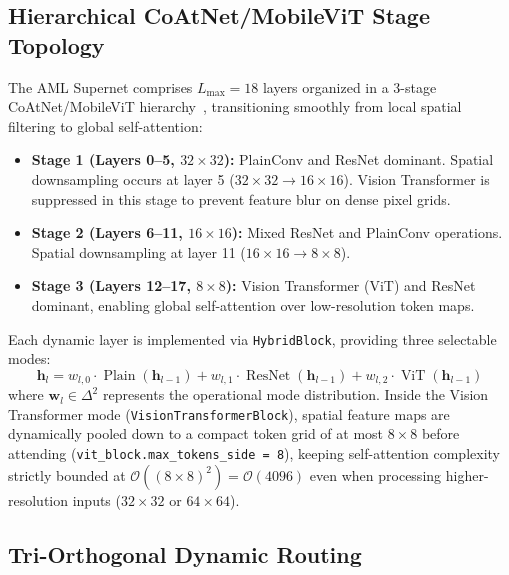 \documentclass[11pt, a4paper]{article}
\begin{document}
\subsection{Hierarchical CoAtNet/MobileViT Stage Topology}

The AML Supernet comprises $L_{\max} = 18$ layers organized in a 3-stage CoAtNet/MobileViT hierarchy~\cite{dai2021coatnet, mehta2021mobilevit}, transitioning smoothly from local spatial filtering to global self-attention:
\begin{itemize}
    \item \textbf{Stage 1 (Layers 0--5, $32 \times 32$):} PlainConv and ResNet dominant. Spatial downsampling occurs at layer 5 ($32 \times 32 \to 16 \times 16$). Vision Transformer is suppressed in this stage to prevent feature blur on dense pixel grids.
    \item \textbf{Stage 2 (Layers 6--11, $16 \times 16$):} Mixed ResNet and PlainConv operations. Spatial downsampling at layer 11 ($16 \times 16 \to 8 \times 8$).
    \item \textbf{Stage 3 (Layers 12--17, $8 \times 8$):} Vision Transformer (ViT) and ResNet dominant, enabling global self-attention over low-resolution token maps.
\end{itemize}

Each dynamic layer is implemented via \texttt{HybridBlock}, providing three selectable modes:
\begin{equation}
    \mathbf{h}_{l} = w_{l, 0} \cdot \operatorname{Plain}(\mathbf{h}_{l-1}) + w_{l, 1} \cdot \operatorname{ResNet}(\mathbf{h}_{l-1}) + w_{l, 2} \cdot \operatorname{ViT}(\mathbf{h}_{l-1})
\end{equation}
where $\mathbf{w}_l \in \Delta^2$ represents the operational mode distribution. Inside the Vision Transformer mode (\texttt{VisionTransformerBlock}), spatial feature maps are dynamically pooled down to a compact token grid of at most $8{\times}8$ before attending (\texttt{vit\_block.max\_tokens\_side = 8}), keeping self-attention complexity strictly bounded at $\mathcal{O}((8\times 8)^2) = \mathcal{O}(4096)$ even when processing higher-resolution inputs ($32\times 32$ or $64\times 64$).

\subsection{Tri-Orthogonal Dynamic Routing}
\end{document}
